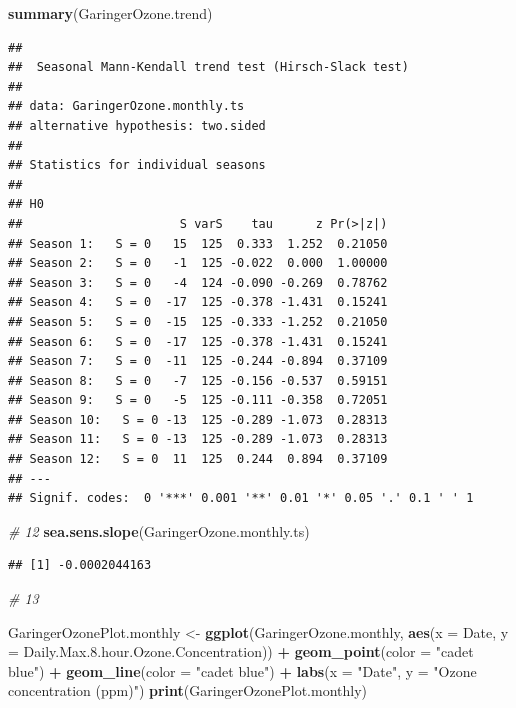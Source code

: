 \documentclass[]{article}
\newenvironment{Shaded}{\begin{snugshade}}{\end{snugshade}}
\newcommand{\CommentTok}[1]{\textcolor[rgb]{0.56,0.35,0.01}{\textit{#1}}}
\newcommand{\DataTypeTok}[1]{\textcolor[rgb]{0.13,0.29,0.53}{#1}}
\newcommand{\FloatTok}[1]{\textcolor[rgb]{0.00,0.00,0.81}{#1}}
\newcommand{\KeywordTok}[1]{\textcolor[rgb]{0.13,0.29,0.53}{\textbf{#1}}}
\newcommand{\NormalTok}[1]{#1}
\newcommand{\OperatorTok}[1]{\textcolor[rgb]{0.81,0.36,0.00}{\textbf{#1}}}
\newcommand{\StringTok}[1]{\textcolor[rgb]{0.31,0.60,0.02}{#1}}
\begin{document}
\begin{Shaded}
\begin{Highlighting}[]
\KeywordTok{summary}\NormalTok{(GaringerOzone.trend)}
\end{Highlighting}
\end{Shaded}

\begin{verbatim}
## 
##  Seasonal Mann-Kendall trend test (Hirsch-Slack test)
## 
## data: GaringerOzone.monthly.ts
## alternative hypothesis: two.sided
## 
## Statistics for individual seasons
## 
## H0
##                      S varS    tau      z Pr(>|z|)  
## Season 1:   S = 0   15  125  0.333  1.252  0.21050  
## Season 2:   S = 0   -1  125 -0.022  0.000  1.00000  
## Season 3:   S = 0   -4  124 -0.090 -0.269  0.78762  
## Season 4:   S = 0  -17  125 -0.378 -1.431  0.15241  
## Season 5:   S = 0  -15  125 -0.333 -1.252  0.21050  
## Season 6:   S = 0  -17  125 -0.378 -1.431  0.15241  
## Season 7:   S = 0  -11  125 -0.244 -0.894  0.37109  
## Season 8:   S = 0   -7  125 -0.156 -0.537  0.59151  
## Season 9:   S = 0   -5  125 -0.111 -0.358  0.72051  
## Season 10:   S = 0 -13  125 -0.289 -1.073  0.28313  
## Season 11:   S = 0 -13  125 -0.289 -1.073  0.28313  
## Season 12:   S = 0  11  125  0.244  0.894  0.37109  
## ---
## Signif. codes:  0 '***' 0.001 '**' 0.01 '*' 0.05 '.' 0.1 ' ' 1
\end{verbatim}

\begin{Shaded}
\begin{Highlighting}[]
\CommentTok{# 12}
\KeywordTok{sea.sens.slope}\NormalTok{(GaringerOzone.monthly.ts)}
\end{Highlighting}
\end{Shaded}

\begin{verbatim}
## [1] -0.0002044163
\end{verbatim}

\begin{Shaded}
\begin{Highlighting}[]
\CommentTok{# 13}

\NormalTok{GaringerOzonePlot.monthly <-}
\StringTok{  }\KeywordTok{ggplot}\NormalTok{(GaringerOzone.monthly, }
         \KeywordTok{aes}\NormalTok{(}\DataTypeTok{x =}\NormalTok{ Date, }\DataTypeTok{y =}\NormalTok{ Daily.Max.}\FloatTok{8.}\NormalTok{hour.Ozone.Concentration)) }\OperatorTok{+}
\StringTok{   }\KeywordTok{geom_point}\NormalTok{(}\DataTypeTok{color =} \StringTok{"cadet blue"}\NormalTok{) }\OperatorTok{+}
\StringTok{  }\KeywordTok{geom_line}\NormalTok{(}\DataTypeTok{color =} \StringTok{"cadet blue"}\NormalTok{) }\OperatorTok{+}
\StringTok{  }\KeywordTok{labs}\NormalTok{(}\DataTypeTok{x =} \StringTok{"Date"}\NormalTok{, }\DataTypeTok{y =} \StringTok{"Ozone concentration (ppm)"}\NormalTok{) }
\KeywordTok{print}\NormalTok{(GaringerOzonePlot.monthly)}
\end{Highlighting}
\end{Shaded}
\end{document}
